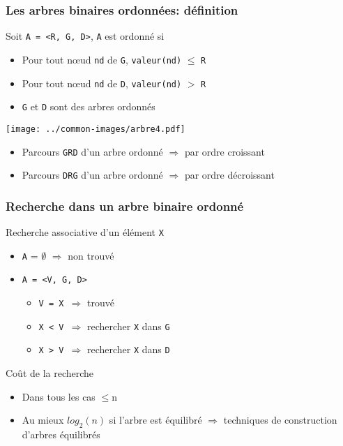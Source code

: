 \documentclass[table,handout,tikz,12pt,svgnames]{beamer}
\begin{document}
\begin{frame}[fragile=singleslide]
	\frametitle{Les arbres binaires ordonnées: définition}
	\begin{block}{Soit \texttt{A = <R, G, D>}, \texttt{A} est ordonné si}
		\begin{itemize}
			\item Pour tout nœud \texttt{nd} de \texttt{G}, \texttt{valeur(nd)} $\leq$ \texttt{R}
			\item Pour tout nœud \texttt{nd} de \texttt{D}, \texttt{valeur(nd)} $>$ \texttt{R}
			\item \texttt{G} et \texttt{D} sont des arbres ordonnés
		\end{itemize}
	\end{block}
	\begin{center}
		{\texttt{[image: ../common-images/arbre4.pdf]}}
	\end{center}
	\vspace{-1.1cm}
	\begin{block}{}
		\begin{itemize}
			\item Parcours \texttt{GRD} d'un arbre ordonné $\Rightarrow$ par ordre croissant
			\item Parcours \texttt{DRG} d'un arbre ordonné $\Rightarrow$ par ordre décroissant
		\end{itemize}
	\end{block}
\end{frame}


\begin{frame}[fragile=singleslide]
	\frametitle{Recherche dans un arbre binaire ordonné}
	\begin{block}{Recherche associative d'un élément \texttt{X}}
		\begin{itemize}
			\item \texttt{A} = $\emptyset$ $\Rightarrow$ non trouvé
			\item \texttt{A = <V, G, D>}
			\begin{itemize}
				\item \texttt{V = X $\Rightarrow$} trouvé
				\item \texttt{X < V $\Rightarrow$} rechercher \texttt{X} dans \texttt{G}
				\item \texttt{X > V $\Rightarrow$} rechercher \texttt{X} dans \texttt{D}
			\end{itemize}
		\end{itemize}
	\end{block}
	\begin{block}{Coût de la recherche}
		\begin{itemize}
			\item Dans tous les cas $\leq$n
			\item Au mieux $log_2(n)$ si l'arbre est équilibré $\Rightarrow$ techniques de construction d'arbres équilibrés
		\end{itemize}
	\end{block}
\end{frame}
\end{document}
